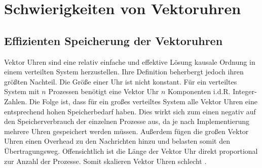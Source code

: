 \section{Schwierigkeiten von Vektoruhren}
\subsection{Effizienten Speicherung der Vektoruhren}





Vektor Uhren sind eine relativ einfache und effektive Lösung kausale Ordnung in einem verteilten System herzustellen.
Ihre Definition beherbergt jedoch ihren größten Nachteil.
Die Größe einer Uhr ist nicht konstant.
Für ein verteiltes System mit $n$ Prozessen benötigt eine Vektor Uhr $n$ Komponenten i.d.R. Integer-Zahlen.
Die Folge ist, dass für ein großes verteiltes System alle Vektor Uhren eine entsprechend hohen Speicherbedarf haben.
Dies wirkt sich zum einen negativ auf den Speicherverbrauch der einzelnen Prozesse aus, da je nach Implementierung mehrere Uhren gespeichert werden müssen.
Außerdem fügen die großen Vektor Uhren einen Overhead zu den Nachrichten hinzu und belasten somit den Übertragungsweg.
Offensichtlich ist die Länge der Vektor Uhr direkt proportional zur Anzahl der Prozesse.
Somit skalieren Vektor Uhren schlecht \cite{torres1999plausible}.


